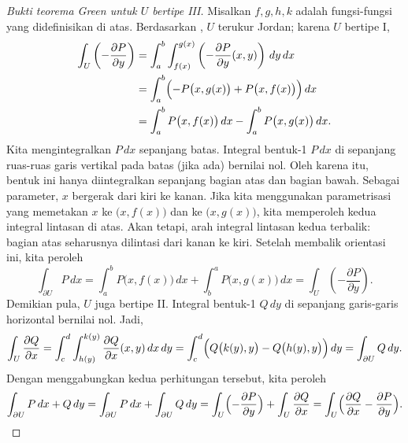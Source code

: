 \begin{proof}[Bukti teorema Green untuk $U$ bertipe III]
Misalkan $f,g,h,k$ adalah fungsi-fungsi yang didefinisikan di atas.
Berdasarkan ,
$U$ terukur Jordan; karena $U$ bertipe I\@,
\begin{equation*}
\begin{split}
\int_U 
\left(- \frac{\partial P}{\partial y} \right)
& =
\int_a^b \int_{f(x)}^{g(x)}
\left(- \frac{\partial P}{\partial y} (x,y) \right)
\, dy \, dx 
\\
& =
\int_a^b \Bigl(
- P\bigl(x,g(x)\bigr) +
P\bigl(x,f(x)\bigr)
\Bigr) \, dx
\\
& =
\int_a^b P\bigl(x,f(x)\bigr) \, dx 
-
\int_a^b P\bigl(x,g(x)\bigr) \, dx .
\end{split}
\end{equation*}
Kita mengintegralkan $P\,dx$ sepanjang batas.
Integral bentuk-1 $P\,dx$ di sepanjang ruas-ruas garis vertikal pada batas
(jika ada) bernilai nol. Oleh karena itu, bentuk ini hanya diintegralkan sepanjang
bagian atas dan bagian bawah. Sebagai parameter, $x$ bergerak dari kiri ke
kanan. Jika kita menggunakan parametrisasi yang memetakan $x$ ke
$\bigl(x,f(x)\bigr)$ dan ke $\bigl(x,g(x)\bigr)$, kita memperoleh kedua integral
lintasan di atas. Akan tetapi, arah integral lintasan kedua terbalik: bagian atas
seharusnya dilintasi dari kanan ke kiri. Setelah membalik orientasi ini, kita
peroleh
\begin{equation*}
\int_{\partial U} P \, dx
=
\int_a^b P\bigl(x,f(x)\bigr) \, dx 
+
\int_b^a P\bigl(x,g(x)\bigr) \, dx
=
\int_U 
\left(- \frac{\partial P}{\partial y} \right) .
\end{equation*}
Demikian pula, $U$ juga bertipe II\@. Integral bentuk-1 $Q\,dy$ di sepanjang
garis-garis horizontal bernilai nol. Jadi,
\begin{equation*}
\int_U 
\frac{\partial Q}{\partial x}
=
\int_c^d \int_{h(y)}^{k(y)}
\frac{\partial Q}{\partial x}(x,y)
\, dx \, dy 
=
\int_c^d \Bigl(
Q\bigl(k(y),y\bigr) 
-
Q\bigl(h(y),y\bigr)
\Bigr) \, dy 
=
\int_{\partial U} Q \, dy .
\end{equation*}
Dengan menggabungkan kedua perhitungan tersebut, kita peroleh
\begin{equation*}
\int_{\partial U} P\, dx + Q \, dy 
=
\int_{\partial U} P\, dx + \int_{\partial U} Q \, dy 
=
\int_U 
\Bigl(-\frac{\partial P}{\partial y}\Bigr)
+
\int_U 
\frac{\partial Q}{\partial x}
=
\int_U 
\Bigl(
\frac{\partial Q}{\partial x}
-\frac{\partial P}{\partial y}
\Bigr) . \qedhere
\end{equation*}
\end{proof}



